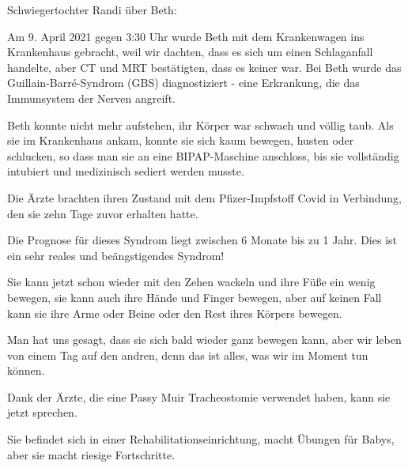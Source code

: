 Schwiegertochter Randi über Beth:

Am 9. April 2021 gegen 3:30 Uhr wurde Beth mit dem Krankenwagen ins Krankenhaus
gebracht, weil wir dachten, dass es sich um einen Schlaganfall handelte, aber CT
und MRT bestätigten, dass es keiner war. Bei Beth wurde das
Guillain-Barré-Syndrom (GBS) diagnostiziert - eine Erkrankung, die das
Immunsystem der Nerven angreift.

Beth konnte nicht mehr aufstehen, ihr Körper war schwach und völlig taub. Als
sie im Krankenhaus ankam, konnte sie sich kaum bewegen, husten oder schlucken,
so dass man sie an eine BIPAP-Maschine anschloss, bis sie vollständig intubiert
und medizinisch sediert werden musste.

Die Ärzte brachten ihren Zustand mit dem Pfizer-Impfstoff Covid in Verbindung,
den sie zehn Tage zuvor erhalten hatte.

Die Prognose für dieses Syndrom liegt zwischen 6 Monate bis zu 1 Jahr. Dies ist
ein sehr reales und beängstigendes Syndrom!

Sie kann jetzt schon wieder mit den Zehen wackeln und ihre Füße ein wenig
bewegen, sie kann auch ihre Hände und Finger bewegen, aber auf keinen Fall kann
sie ihre Arme oder Beine oder den Rest ihres Körpers bewegen.

Man hat uns gesagt, dass sie sich bald wieder ganz bewegen kann, aber wir leben
von einem Tag auf den andren, denn das ist alles, was wir im Moment tun können.

Dank der Ärzte, die eine Passy Muir Tracheostomie verwendet haben, kann sie
jetzt sprechen.

Sie befindet sich in einer Rehabilitationseinrichtung, macht Übungen für Babys,
aber sie macht riesige Fortschritte.
